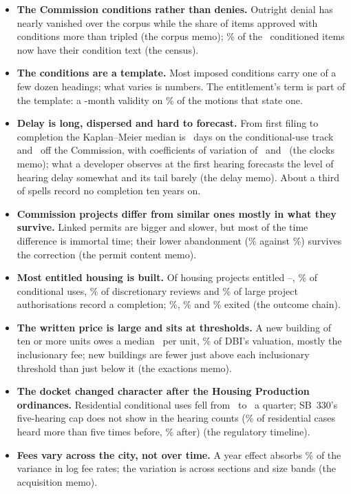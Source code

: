 \documentclass[11pt]{article}
\begin{document}
\begin{itemize}
\item \textbf{The Commission conditions rather than denies.} Outright denial has nearly vanished
over the corpus while the share of items approved with conditions more than tripled (the corpus
memo); \ccCondWithTextPct\% of the \ccCondItems\ conditioned items now have their condition text
(the census).
\item \textbf{The conditions are a template.} Most imposed conditions carry one of a few dozen
headings; what varies is numbers. The entitlement's term is part of the template: a
\ccValidityModal-month validity on \ccValidityModalShare\% of the motions that state one.
\item \textbf{Delay is long, dispersed and hard to forecast.} From first filing to completion the
Kaplan--Meier median is \ckTotMedCu\ days on the conditional-use track and \ckTotMedMin\ off the
Commission, with coefficients of variation of \ckTotCvCu\ and \ckTotCvMin\ (the clocks memo);
what a developer observes at the first hearing forecasts the level of hearing delay somewhat and
its tail barely (the delay memo). About a third of spells record no completion ten years on.
\item \textbf{Commission projects differ from similar ones mostly in what they survive.} Linked
permits are bigger and slower, but most of the time difference is immortal time; their lower
abandonment (\pcLinkedExit\% against \pcUnlinkedExit\%) survives the correction (the permit
content memo).
\item \textbf{Most entitled housing is built.} Of housing projects entitled
\ocMatureFrom--\ocMatureTo, \ocDoneCu\% of conditional uses, \ocDoneDr\% of discretionary
reviews and \ocDoneLpa\% of large project authorisations record a completion; \ocExitCu\%,
\ocExitDr\% and \ocExitLpa\% exited (the outcome chain).
\item \textbf{The written price is large and sits at thresholds.} A new building of ten or more
units owes a median \exPuMed\ per unit, \exShareMed\% of DBI's valuation, mostly the
inclusionary fee; new buildings are fewer just above each inclusionary threshold than just
below it (the exactions memo).
\item \textbf{The docket changed character after the Housing Production ordinances.} Residential
conditional uses fell from \rtResCuPre\ to \rtResCuPost\ a quarter; SB~330's five-hearing cap does
not show in the hearing counts (\rtOverFivePre\% of residential cases heard more than five times
before, \rtOverFivePost\% after) (the regulatory timeline).
\item \textbf{Fees vary across the city, not over time.} A year effect absorbs \acqFeeAbsYear\% of the
variance in log fee rates; the variation is across sections and size bands (the acquisition memo).
\end{itemize}
\end{document}

